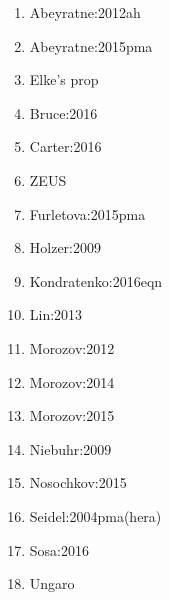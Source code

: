 \begin{enumerate}
	\item \cite{Abeyratne:2012ah} Abeyratne:2012ah
	\item \cite{Abeyratne:2015pma} Abeyratne:2015pma
	\item \cite{Aschenauer:2016} Elke's prop
	\item \cite{Bruce:2016} Bruce:2016
	\item \cite{Carter:2016} Carter:2016
	\item \cite{ZEUS:1993} ZEUS
	\item \cite{Furletova:2015pma} Furletova:2015pma
	\item \cite{Holzer:2009} Holzer:2009
	\item \cite{Kondratenko:2016eqn} Kondratenko:2016eqn
	\item \cite{Lin:2013} Lin:2013
	\item \cite{Morozov:2012} Morozov:2012
	\item \cite{Morozov:2014} Morozov:2014
	\item \cite{Morozov:2015} Morozov:2015
	\item \cite{Niebuhr:2009} Niebuhr:2009
	\item \cite{Nosochkov:2015} Nosochkov:2015
	\item \cite{Seidel:2004} Seidel:2004pma(hera)
	\item \cite{Sosa:2016} Sosa:2016
	\item \cite{Ungaro} Ungaro
\end{enumerate}